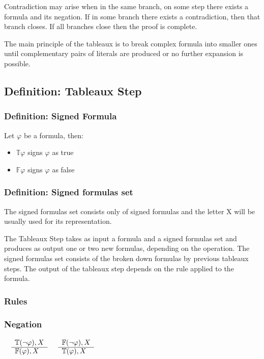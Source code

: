 \documentclass{article}
\begin{document}
	Contradiction may arise when in the same branch, on some step there exists a formula and its negation.
	If in some branch there exists a contradiction, then that branch closes. If all branches close then the proof is complete.
	
	The main principle of the tableaux is to break complex formula into smaller ones until complementary pairs of literals are
	produced or no further expansion is possible.

	\subsection{Definition: Tableaux Step}

		\subsubsection*{Definition: Signed Formula} 
			Let $\varphi$ be a formula, then:
			\begin{itemize}
				\item $\mathbb{T}\varphi$ signs $\varphi$ as true
				\item $\mathbb{F}\varphi$ signs $\varphi$ as false
			\end{itemize}

		\subsubsection*{Definition: Signed formulas set}
			The signed formulas set consists only of signed formulas and the letter X will be usually used for its representation.

		The Tableaux Step takes as input a formula and a signed formulas set and produces as 
		output one or two new formulas, depending on the operation.
		The signed formulas set consists of the broken down formulas by previous tableaux steps.
		The output of the tableaux step depends on the rule applied to the formula.

		\subsubsection{Rules}
		\subsubsection*{Negation}
			$\begin{array}{rl}
				& \mathbb{T}(\neg \varphi), X \\
			      \cline{2-2}
			      & \mathbb{F}(\varphi), X
			\end{array}$
			\:\:\:\:\:\:\:\:\:\:\:\:\:\:\:\:\:\:\:\:\:\:\:\:\:\:\:\:\:\:\:\:\:\:\:\:\:\:\:\:\:\:\:\:\:\:\:\:
			$\begin{array}{rl}
				& \mathbb{F}(\neg \varphi), X \\
			      \cline{2-2}
			      & \mathbb{T}(\varphi), X
			\end{array}$
\end{document}
